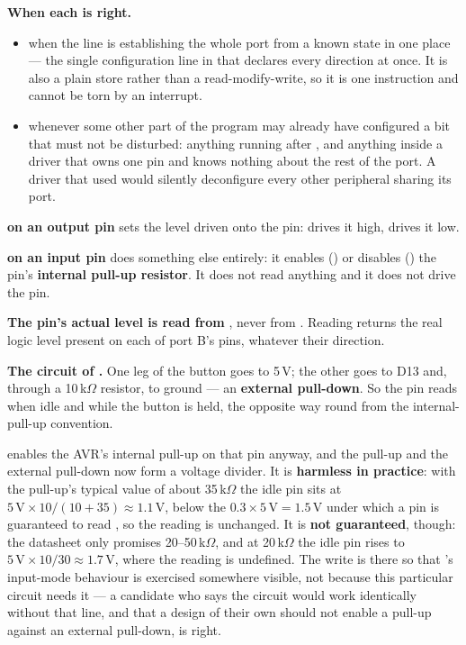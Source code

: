 \textbf{When each is right.} 
\begin{itemize}
  \item \textbf{\code{=}} when the line is establishing the whole port from a known state in one
    place --- the single configuration line in  that declares every direction at
    once. It is also a plain store rather than a read-modify-write, so it is one instruction and
    cannot be torn by an interrupt.
  \item \textbf{\code{|=}} whenever some other part of the program may already have configured a
    bit that must not be disturbed: anything running after , and anything inside a
    driver that owns one pin and knows nothing about the rest of the port. A driver that used
    \code{=} would silently deconfigure every other peripheral sharing its port.
\end{itemize}

\textbf{ on an output pin} sets the level driven onto the pin:  drives it high,
 drives it low.

\textbf{ on an input pin} does something else entirely: it enables () or
disables () the pin's \textbf{internal pull-up resistor}. It does not read anything and it
does not drive the pin.

\textbf{The pin's actual level is read from }, never from . Reading
 returns the real logic level present on each of port B's pins, whatever their
direction. 

\textbf{The circuit of .} One leg of the button goes to 5\,V; the other goes to D13
and, through a 10\,k$\Omega$ resistor, to ground --- an \textbf{external pull-down}. So the pin
reads  when idle and  while the button is held, the opposite way round from the
internal-pull-up convention.

 enables the AVR's internal pull-up on that pin anyway, and the pull-up
and the external pull-down now form a voltage divider. It is \textbf{harmless in practice}: with the
pull-up's typical value of about 35\,k$\Omega$ the idle pin sits at
$5\,\mathrm{V} \times 10 / (10 + 35) \approx 1.1\,\mathrm{V}$, below the
$0.3 \times 5\,\mathrm{V} = 1.5\,\mathrm{V}$ under which a pin is guaranteed to read , so
the reading is unchanged. It is \textbf{not guaranteed}, though: the datasheet only promises
20--50\,k$\Omega$, and at 20\,k$\Omega$ the idle pin rises to
$5\,\mathrm{V} \times 10 / 30 \approx 1.7\,\mathrm{V}$, where the reading is undefined. The write is
there so that 's input-mode behaviour is exercised somewhere visible, not because this
particular circuit needs it --- a candidate who says the circuit would work identically without that
line, and that a design of their own should not enable a pull-up against an external pull-down, is
right. 

